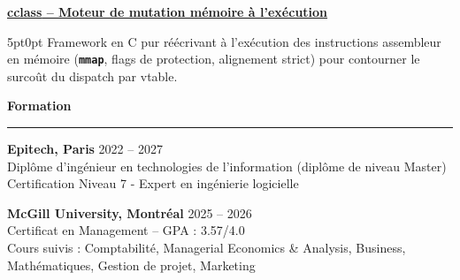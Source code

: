 \documentclass[9pt]{extarticle}
\begin{document}
\par\vspace{8pt}

\underline{\bfseries \href{https://github.com/paulogarithm/cclass}{cclass} -- Moteur de mutation mémoire à l'exécution}
\par
\begin{adjustwidth}{5pt}{0pt}
    Framework en C pur réécrivant à l'exécution des instructions assembleur en mémoire ({\bfseries \texttt{mmap}}, flags de protection, alignement strict) pour contourner le surcoût du dispatch par vtable.
\end{adjustwidth}

\par\vspace{8pt}

{\large\bfseries Formation}
\par\vspace{-8pt}
\rule{\linewidth}{0.4pt}
\par\vspace{5pt}

{\bfseries Epitech, Paris} \hfill 2022 -- 2027 \\
Diplôme d'ingénieur en technologies de l'information (diplôme de niveau Master) \\
Certification Niveau 7 - Expert en ingénierie logicielle

\vspace{6pt}

{\bfseries McGill University, Montréal} \hfill 2025 -- 2026 \\
Certificat en Management -- GPA : 3.57/4.0 \\
Cours suivis : Comptabilité, Managerial Economics \& Analysis, Business, Mathématiques, Gestion de projet, Marketing
\end{document}
